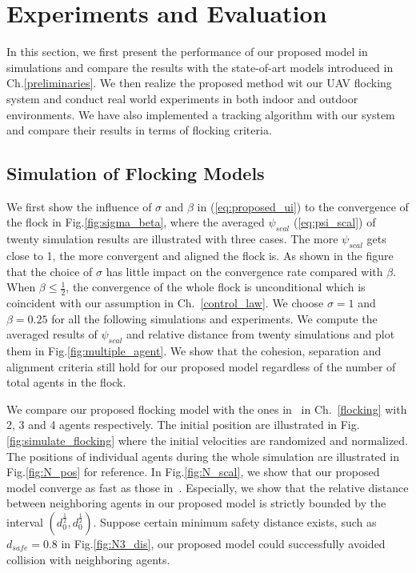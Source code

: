 \chapter{Experiments and Evaluation}\label{experiment}

In this section, we first present the performance of our proposed model in simulations and compare the results with the state-of-art models introduced in Ch.\ref{preliminaries}. We then realize the proposed method wit our UAV flocking system and conduct real world experiments in both indoor and outdoor environments. We have also implemented a tracking algorithm with our system and compare their results in terms of flocking criteria.

\section{Simulation of Flocking Models}

We first show the influence of $\sigma$ and $\beta$ in (\ref{eq:proposed_ui}) to the convergence of the flock in Fig.\ref{fig:sigma_beta}, where the averaged $\psi_{scal}$ (\ref{eq:psi_scal}) of twenty simulation results are illustrated with three cases. The more $\psi_{scal}$ gets close to 1, the more convergent and aligned the flock is. As shown in the figure that the choice of $\sigma$ has little impact on the convergence rate compared with $\beta$. When $\beta\leq\frac{1}{2}$, the convergence of the whole flock is unconditional which is coincident with our assumption in Ch.~\ref{control_law}. We choose $\sigma=1$ and $\beta=0.25$ for all the following simulations and experiments. We compute the averaged results of $\psi_{scal}$ and relative distance from twenty simulations and plot them in Fig.\ref{fig:multiple_agent}. We show that the cohesion, separation and alignment criteria still hold for our proposed model regardless of the number of total agents in the flock.

We compare our proposed flocking model with the ones in~\cite{Vicsek1995,CuckerSmale2007,CuckerDong2010} in Ch.~\ref{flocking} with 2, 3 and 4 agents respectively. The initial position are illustrated in Fig.\ref{fig:simulate_flocking} where the initial velocities are randomized and normalized. The positions of individual agents during the whole simulation are illustrated in Fig.\ref{fig:N_pos} for reference. In Fig.\ref{fig:N_scal}, we show that our proposed model converge as fast as those in~\cite{Vicsek1995,CuckerSmale2007,CuckerDong2010}. Especially, we show that the relative distance between neighboring agents in our proposed model is strictly bounded by the interval $(d_0^{\frac{1}{2}}, d_0^{\frac{1}{2}})$. Suppose certain minimum safety distance exists, such as $d_{safe}=0.8$ in Fig.\ref{fig:N3_dis}, our proposed model could successfully avoided collision with neighboring agents.

